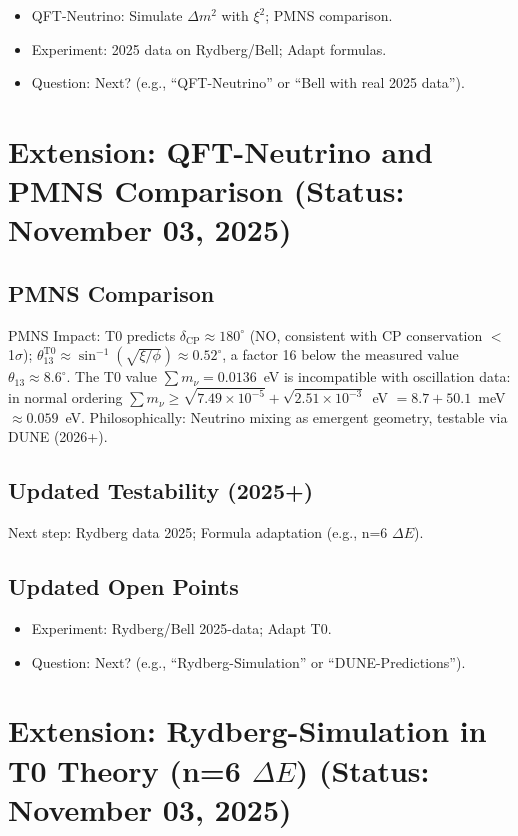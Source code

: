	\begin{itemize}
		\item QFT-Neutrino: Simulate $\Delta m^2$ with $\xi^2$; PMNS comparison.
		\item Experiment: 2025 data on Rydberg/Bell; Adapt formulas.
		\item Question: Next? (e.g., ``QFT-Neutrino'' or ``Bell with real 2025 data'').
	\end{itemize}
	
	\section{Extension: QFT-Neutrino and PMNS Comparison (Status: November 03, 2025)}
	
	\subsection{PMNS Comparison}
	
	
	PMNS Impact: T0 predicts $\delta_\text{CP} \approx 180^\circ$ (NO, consistent with CP conservation $<$1$\sigma$); $\theta_{13}^{\text{T0}} \approx \sin^{-1}(\sqrt{\xi / \phi}) \approx 0.52^\circ$, a factor 16 below the measured value $\theta_{13} \approx 8.6^\circ$. The T0 value $\sum m_\nu = 0.0136$~eV is incompatible with oscillation data: in normal ordering $\sum m_\nu \geq \sqrt{7.49\times10^{-5}} + \sqrt{2.51\times10^{-3}}$~eV $= 8.7 + 50.1$~meV $\approx 0.059$~eV. Philosophically: Neutrino mixing as emergent geometry, testable via DUNE (2026+).
	
	\subsection{Updated Testability (2025+)}
	
	Next step: Rydberg data 2025; Formula adaptation (e.g., n=6 $\Delta E$).
	
	\subsection{Updated Open Points}
	
	\begin{itemize}
		\item Experiment: Rydberg/Bell 2025-data; Adapt T0.
		\item Question: Next? (e.g., ``Rydberg-Simulation'' or ``DUNE-Predictions'').
	\end{itemize}
	
	\section{Extension: Rydberg-Simulation in T0 Theory (n=6 $\Delta E$) (Status: November 03, 2025)}
	
